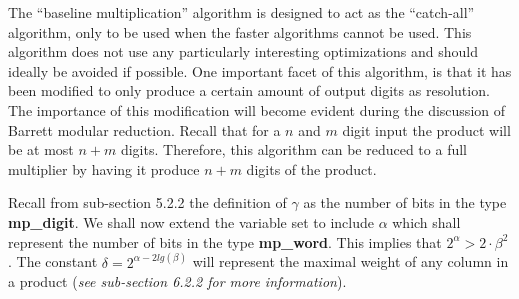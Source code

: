 \documentclass[b5paper]{book}
\begin{document}
The ``baseline multiplication'' algorithm is designed to act as the ``catch-all'' algorithm, only to be used when the faster algorithms cannot be 
used.  This algorithm does not use any particularly interesting optimizations and should ideally be avoided if possible.    One important 
facet of this algorithm, is that it has been modified to only produce a certain amount of output digits as resolution.  The importance of this 
modification will become evident during the discussion of Barrett modular reduction.  Recall that for a $n$ and $m$ digit input the product 
will be at most $n + m$ digits.  Therefore, this algorithm can be reduced to a full multiplier by having it produce $n + m$ digits of the product.  

Recall from sub-section 5.2.2 the definition of $\gamma$ as the number of bits in the type \textbf{mp\_digit}.  We shall now extend the variable set to 
include $\alpha$ which shall represent the number of bits in the type \textbf{mp\_word}.  This implies that $2^{\alpha} > 2 \cdot \beta^2$.  The 
constant $\delta = 2^{\alpha - 2lg(\beta)}$ will represent the maximal weight of any column in a product (\textit{see sub-section 6.2.2 for more information}).
\end{document}
